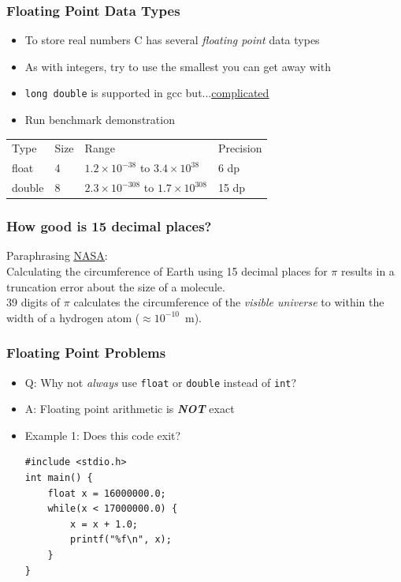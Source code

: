 \documentclass[14pt]{beamer}
\begin{document}
\begin{frame}[fragile]
\frametitle{Floating Point Data Types}
\begin{itemize}
\item To store real numbers C has several \textit{floating point} data types
\item As with integers, try to use the smallest you can get away with
\item \texttt{long double} is supported in gcc but...\underline{\href{https://en.wikipedia.org/wiki/Long_double}{complicated}}
\item Run benchmark demonstration
\end{itemize}

\begin{table}[] \small
\begin{tabular}{llll}
Type        & Size & Range                                             & Precision \\
float       & 4    & $1.2\times 10^{-38}$ to $3.4 \times 10^{38}$      & 6 dp      \\
double      & 8    & $2.3 \times 10^{-308}$ to $1.7 \times 10^{308}$     & 15 dp     \\   
\end{tabular}
\end{table}
\end{frame}

\begin{frame}
\frametitle{How good is 15 decimal places?}
Paraphrasing \underline{\href{https://www.jpl.nasa.gov/edu/news/2016/3/16/how-many-decimals-of-pi-do-we-really-need/}{NASA}}: \\
\vspace{5mm}
Calculating the circumference of Earth using 15 decimal places for $\pi$ results in a truncation error about the size of a molecule.\\
\vspace{5mm}
39 digits of $\pi$ calculates the circumference of the \textit{visible universe} to within the width of a hydrogen atom ($\approx10^{-10}$~m).

\end{frame}

\begin{frame}[fragile]
\frametitle{Floating Point Problems}
\begin{itemize}
\item Q: Why not \textit{always} use \texttt{float} or \texttt{double} instead of \texttt{int}?
\item A: Floating point arithmetic is \textbf{\textit{NOT}} exact
\item Example 1: Does this code exit?
\begin{lstlisting}[style=CStyle,caption=\texttt{floatLoop.c}]
#include <stdio.h>
int main() {
	float x = 16000000.0;
	while(x < 17000000.0) {
		x = x + 1.0;
		printf("%f\n", x);
	}
}
\end{lstlisting}
\end{itemize}
\end{frame}
\end{document}
